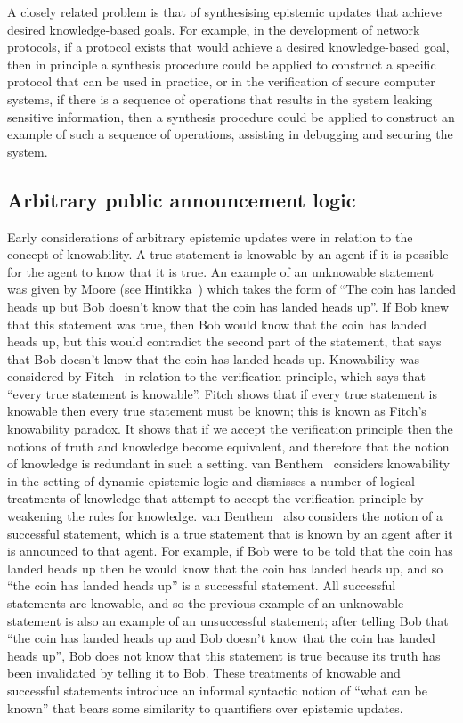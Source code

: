 A closely related problem is that of synthesising epistemic updates that achieve desired knowledge-based goals.
For example, in the development of network protocols, if a protocol exists that would achieve a desired knowledge-based goal, then in principle a synthesis procedure could be applied to construct a specific protocol that can be used in practice, or in the verification of secure computer systems, if there is a sequence of operations that results in the system leaking sensitive information, then a synthesis procedure could be applied to construct an example of such a sequence of operations, assisting in debugging and securing the system.

\subsection{Arbitrary public announcement logic}

Early considerations of arbitrary epistemic updates were in relation to the concept of knowability.
A true statement is knowable by an agent if it is possible for the agent to know that it is true.
An example of an unknowable statement was given by Moore (see Hintikka~\cite{hintikka:1962}) which takes the form of ``The coin has landed heads up but Bob doesn't know that the coin has landed heads up''.
If Bob knew that this statement was true, then Bob would know that the coin has landed heads up, but this would contradict the second part of the statement, that says that Bob doesn't know that the coin has landed heads up.
Knowability was considered by Fitch~\cite{fitch:1963} in relation to the verification principle, which says that ``every true statement is knowable''.
Fitch shows that if every true statement is knowable then every true statement must be known; this is known as Fitch's knowability paradox.
It shows that if we accept the verification principle then the notions of truth and knowledge become equivalent, and therefore that the notion of knowledge is redundant in such a setting.
van Benthem~\cite{vanbenthem:2004} considers knowability in the setting of dynamic epistemic logic and dismisses a number of logical treatments of knowledge that attempt to accept the verification principle by weakening the rules for knowledge.
van Benthem~\cite{vanbenthem:2004} also considers the notion of a successful statement, which is a true statement that is known by an agent after it is announced to that agent.
For example, if Bob were to be told that the coin has landed heads up then he would know that the coin has landed heads up, and so ``the coin has landed heads up'' is a successful statement.
All successful statements are knowable, and so the previous example of an unknowable statement is also an example of an unsuccessful statement; after telling Bob that ``the coin has landed heads up and Bob doesn't know that the coin has landed heads up'', Bob does not know that this statement is true because its truth has been invalidated by telling it to Bob.
These treatments of knowable and successful statements introduce an informal syntactic notion of ``what can be known'' that bears some similarity to quantifiers over epistemic updates.

